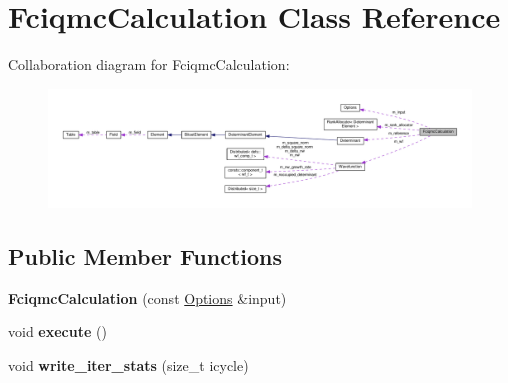 \hypertarget{classFciqmcCalculation}{}\section{Fciqmc\+Calculation Class Reference}
\label{classFciqmcCalculation}


Collaboration diagram for Fciqmc\+Calculation\+:
\nopagebreak
\begin{figure}[H]
\begin{center}
\leavevmode
\includegraphics[width=350pt]{classFciqmcCalculation__coll__graph}
\end{center}
\end{figure}
\subsection*{Public Member Functions}
\begin{DoxyCompactItemize}
\item 
{\bfseries Fciqmc\+Calculation} (const \hyperlink{structOptions}{Options} \&input)\hypertarget{classFciqmcCalculation_a7ad3b249a7b10c8a4e199f7b5b1cd3a6}{}\label{classFciqmcCalculation_a7ad3b249a7b10c8a4e199f7b5b1cd3a6}

\item 
void {\bfseries execute} ()\hypertarget{classFciqmcCalculation_a4dd7b05054552de32424ef19221f89db}{}\label{classFciqmcCalculation_a4dd7b05054552de32424ef19221f89db}

\item 
void {\bfseries write\+\_\+iter\+\_\+stats} (size\+\_\+t icycle)\hypertarget{classFciqmcCalculation_ae315657d8686933c407fa66d08997820}{}\label{classFciqmcCalculation_ae315657d8686933c407fa66d08997820}

\end{DoxyCompactItemize}
